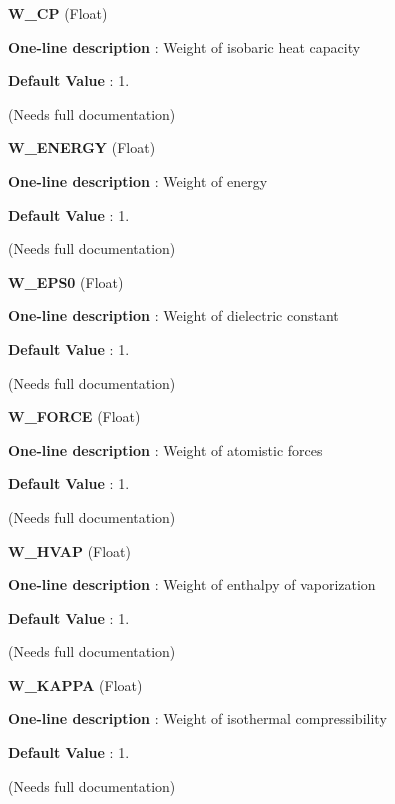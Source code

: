 \begin{DoxyItemize}
\item {\bfseries  W\-\_\-\-C\-P } (Float) \par
{\bfseries  One-\/line description }\-: Weight of isobaric heat capacity \par
{\bfseries  Default Value }\-: 1. \par
(Needs full documentation)\end{DoxyItemize}
\begin{DoxyItemize}
\item {\bfseries  W\-\_\-\-E\-N\-E\-R\-G\-Y } (Float) \par
{\bfseries  One-\/line description }\-: Weight of energy \par
{\bfseries  Default Value }\-: 1. \par
(Needs full documentation)\end{DoxyItemize}
\begin{DoxyItemize}
\item {\bfseries  W\-\_\-\-E\-P\-S0 } (Float) \par
{\bfseries  One-\/line description }\-: Weight of dielectric constant \par
{\bfseries  Default Value }\-: 1. \par
(Needs full documentation)\end{DoxyItemize}
\begin{DoxyItemize}
\item {\bfseries  W\-\_\-\-F\-O\-R\-C\-E } (Float) \par
{\bfseries  One-\/line description }\-: Weight of atomistic forces \par
{\bfseries  Default Value }\-: 1. \par
(Needs full documentation)\end{DoxyItemize}
\begin{DoxyItemize}
\item {\bfseries  W\-\_\-\-H\-V\-A\-P } (Float) \par
{\bfseries  One-\/line description }\-: Weight of enthalpy of vaporization \par
{\bfseries  Default Value }\-: 1. \par
(Needs full documentation)\end{DoxyItemize}
\begin{DoxyItemize}
\item {\bfseries  W\-\_\-\-K\-A\-P\-P\-A } (Float) \par
{\bfseries  One-\/line description }\-: Weight of isothermal compressibility \par
{\bfseries  Default Value }\-: 1. \par
(Needs full documentation)\end{DoxyItemize}
